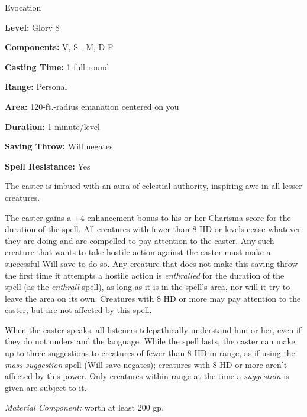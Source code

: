 
Evocation

\textbf{Level:} Glory 8

\textbf{Components:} V, S , M, D F

\textbf{Casting Time:} 1 full round

\textbf{Range:} Personal

\textbf{Area:} 120-ft.-radius emanation centered on you

\textbf{Duration:} 1 minute/level

\textbf{Saving Throw:} Will negates

\textbf{Spell Resistance:} Yes

The caster is imbued with an aura of celestial authority, inspiring awe in all 
lesser creatures.

The caster gains a +4 enhancement bonus to his or her Charisma score for the duration 
of the spell. All creatures with fewer than 8 HD or levels cease whatever they 
are doing and are compelled to pay attention to the caster. Any such creature that 
wants to take hostile action against the caster must make a successful Will save 
to do so. Any creature that does not make this saving throw the first time it attempts 
a hostile action is \textit{enthralled} for the duration of the spell (as the \textit{enthrall 
}spell), as long as it is in the spell's area, nor will it try to leave the area 
on its own. Creatures with 8 HD or more may pay attention to the caster, but are 
not affected by this spell.

When the caster speaks, all listeners telepathically understand him or her, even 
if they do not understand the language. While the spell lasts, the caster can make 
up to three suggestions to creatures of fewer than 8 HD in range, as if using the 
\textit{mass suggestion} spell (Will save negates); creatures with 8 HD or more 
aren't affected by this power. Only creatures within range at the time a \textit{suggestion 
}is given are subject to it.

\textit{Material Component:} worth at least 200 gp.
